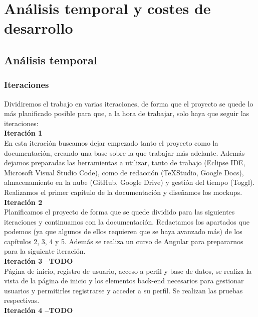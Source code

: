 \chapter{An\'alisis temporal y costes de desarrollo}\label{anatemporal}
\section{An\'alisis temporal}
\subsection{Iteraciones}

Dividiremos el trabajo en varias iteraciones, de forma que el proyecto se quede lo más planificado posible para que, a la hora de trabajar, solo haya que seguir las iteraciones:\\

\textbf{Iteración 1}\\

En esta iteración buscamos dejar empezado tanto el proyecto como la documentación, creando una base sobre la que trabajar más adelante. Además dejamos preparadas las herramientas a utilizar, tanto de trabajo (Eclipse IDE, Microsoft Visual Studio Code), como de redacción (TeXStudio, Google Docs), almacenamiento en la nube (GitHub, Google Drive) y gestión del tiempo (Toggl). Realizamos el primer capítulo de la documentación y diseñamos los mockups.\\

\textbf{Iteración 2}\\

Planificamos el proyecto de forma que se quede dividido para las siguientes iteraciones y continuamos con la documentación. Redactamos los apartados que podemos (ya que algunos de ellos requieren que se haya avanzado más) de los capítulos 2, 3, 4 y 5. Además se realiza un curso de Angular para prepararnos para la siguiente iteración.\\

\textbf{Iteración 3 --TODO}\\

Página de inicio, registro de usuario, acceso a perfil y base de datos, se realiza la vista de la página de inicio y los elementos back-end necesarios para gestionar usuarios y permitirles registrarse y acceder a su perfil. Se realizan las pruebas respectivas.\\

\textbf{Iteración 4 --TODO}\\

